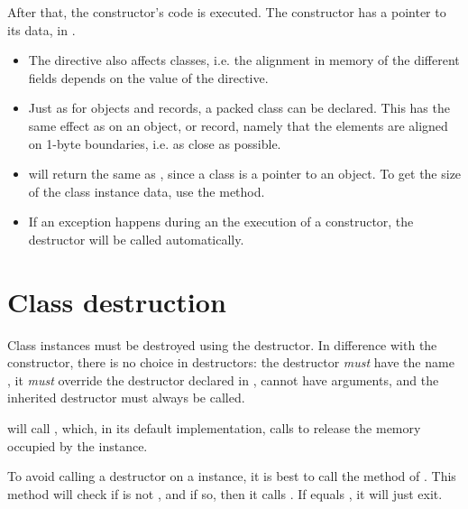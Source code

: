 After that, the constructor's code is executed. 
The constructor has a pointer to its data, in .

\begin{remark}
\begin{itemize}
\item The  directive also affects classes,
i.e. the alignment in memory of the different fields depends on the
value of  the  directive.
\item Just as for objects and records, a packed class can be declared.
This has the same effect as on an object, or record, namely that the
elements are aligned on 1-byte boundaries, i.e. as close as possible.
\item {} will return the same as , 
since a class is a pointer to an object. To get the size of the class 
instance data, use the  method.
\item If an exception happens during an the execution of a constructor, 
the destructor will be called automatically.
\end{itemize}
\end{remark}



\section{Class destruction}
Class instances must be destroyed using the destructor. In difference with
the constructor, there is no choice in destructors: the destructor {\em must} 
have the name , it {\em must}  override the  destructor 
declared in , cannot have arguments, and the inherited destructor 
must always be called.

 will call , which, in its default implementation,
calls  to release the memory occupied by the instance.

To avoid calling a destructor on a  instance, it is best to call
the  method of . This method will check if  is not , 
and if so, then it calls . If  equals , it
will just exit.

